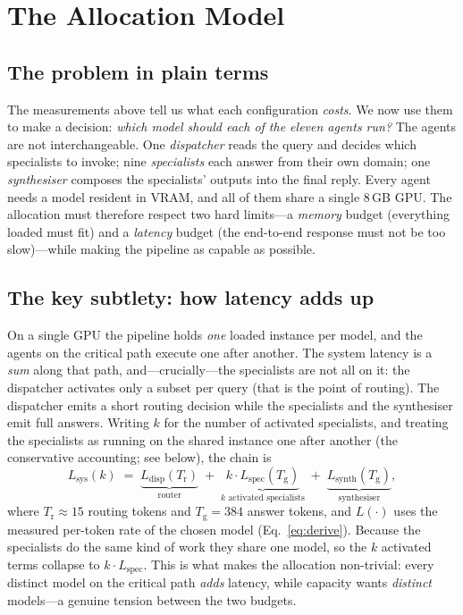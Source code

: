 \documentclass[11pt]{article}
\begin{document}
\section{The Allocation Model}
\label{sec:milp}

\subsection{The problem in plain terms}
The measurements above tell us what each configuration \emph{costs}. We now use
them to make a decision: \emph{which model should each of the eleven agents run?}
The agents are not interchangeable. One \emph{dispatcher} reads the query and
decides which specialists to invoke; nine \emph{specialists} each answer from
their own domain; one \emph{synthesiser} composes the specialists' outputs into
the final reply. Every agent needs a model resident in VRAM, and all of them
share a single $8$\,GB GPU. The allocation must therefore respect two hard
limits---a \emph{memory} budget (everything loaded must fit) and a \emph{latency}
budget (the end-to-end response must not be too slow)---while making the pipeline
as capable as possible.

\subsection{The key subtlety: how latency adds up}
\label{sec:latency-subtlety}
On a single GPU the pipeline holds \emph{one} loaded instance per model, and the
agents on the critical path execute one after another. The system latency is a
\emph{sum} along that path, and---crucially---the specialists are not all on it: the
dispatcher activates only a subset per query (that is the point of routing). The
dispatcher emits a short routing decision while the specialists and the synthesiser
emit full answers. Writing $k$ for the number of activated specialists, and treating
the specialists as running on the shared instance one after another (the conservative
accounting; see below), the chain is
\begin{equation}
L_{\text{sys}}(k) \;=\; \underbrace{L_{\text{disp}}(T_{\text{r}})}_{\text{router}}
\;+\; \underbrace{k\cdot L_{\text{spec}}(T_{\text{g}})}_{k\text{ activated specialists}}
\;+\; \underbrace{L_{\text{synth}}(T_{\text{g}})}_{\text{synthesiser}},
\label{eq:chain-intuition}
\end{equation}
where $T_{\text{r}}{\approx}15$ routing tokens and $T_{\text{g}}{=}384$ answer
tokens, and $L(\cdot)$ uses the measured per-token rate of the chosen model
(Eq.~\ref{eq:derive}). Because the specialists do the same kind of work they share
one model, so the $k$ activated terms collapse to $k\cdot L_{\text{spec}}$. This is
what makes the allocation non-trivial: every distinct model on the critical path
\emph{adds} latency, while capacity wants \emph{distinct} models---a genuine tension
between the two budgets.
\end{document}

